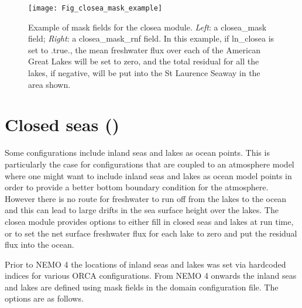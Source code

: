 \documentclass[../main/NEMO_manual]{subfiles}
\begin{document}
\begin{figure}[!tbp]
  \begin{center}
    \texttt{[image: Fig\_closea\_mask\_example]}
    \caption{
      \protect\label{fig:closea_mask_example}
      Example of mask fields for the closea module. \textit{Left}: a
      closea\_mask field; \textit{Right}: a closea\_mask\_rnf
      field. In this example, if ln\_closea is set to .true., the mean
      freshwater flux over each of the American Great Lakes will be
      set to zero, and the total residual for all the lakes, if
      negative, will be put into the St Laurence Seaway in the area
      shown. 
    }
  \end{center}
\end{figure}

\section{Closed seas (\protect{})}
\label{sec:MISC_closea}

Some configurations include inland seas and lakes as ocean
points. This is particularly the case for configurations that are
coupled to an atmosphere model where one might want to include inland
seas and lakes as ocean model points in order to provide a better
bottom boundary condition for the atmosphere. However there is no
route for freshwater to run off from the lakes to the ocean and this
can lead to large drifts in the sea surface height over the lakes. The
closea module provides options to either fill in closed seas and lakes
at run time, or to set the net surface freshwater flux for each lake
to zero and put the residual flux into the ocean.

Prior to NEMO 4 the locations of inland seas and lakes was set via
hardcoded indices for various ORCA configurations. From NEMO 4 onwards
the inland seas and lakes are defined using mask fields in the
domain configuration file. The options are as follows.
\end{document}
